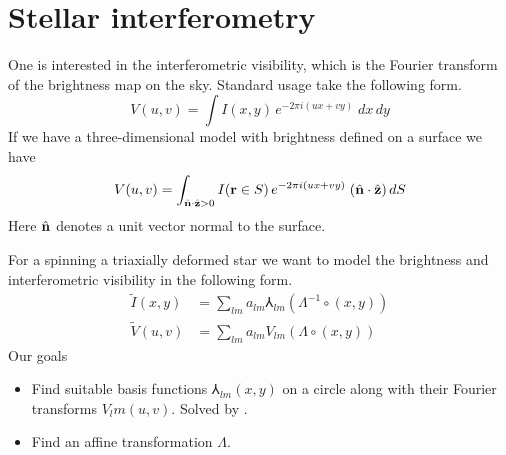 \section{Stellar interferometry}

One is interested in the interferometric visibility, which is the
Fourier transform of the brightness map on the sky.  Standard usage
take the following form.
\begin{equation}
  V(u,v) = \int I(x,y)\, e^{-2\pi i (u x + v y)}\; dx\, dy
  \label{eq:visibility-definition}
\end{equation}
If we have a three-dimensional model with brightness defined on a
surface we have
\begin{equation}
  V(u,v) = \int_{\uvecn\cdot\uvecz > 0}
  I(\vecr\in S)\, 
  e^{-2\pi i (u x + v y)}\; (\uvecn\cdot\uvecz)\, dS
  \label{eq:deformation-visibility-integral}
\end{equation}
Here $\hat{\mathbf n}$ denotes a unit vector normal to the surface.

For a spinning a triaxially deformed star we want to model the
brightness and interferometric visibility in the following form.
\begin{equation}
  \begin{aligned}
    \tilde I(x,y) &= \sum_{lm} a_{lm} \Yup_{lm}\left(\Lambda^{-1}\circ(x,y)\right) \\
    \tilde V(u,v) &= \sum_{lm} a_{lm} V_{lm}\left(\Lambda\circ(x,y)\right)
  \end{aligned}
\end{equation}
Our goals
\begin{itemize}
  \item Find suitable basis functions $\Yup_{lm}(x,y)$ on a circle
    along with their Fourier transforms $V_lm(u,v)$.  Solved by \cite{2026PASP..138e4504D}.
  \item Find an affine transformation $\Lambda$.
\end{itemize}


